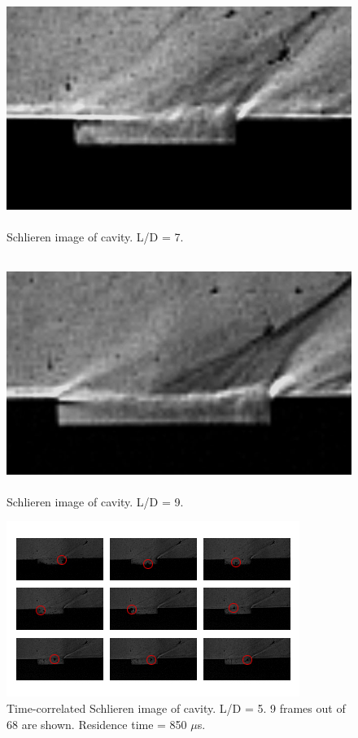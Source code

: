 \begin{figure}
\centering
\includegraphics[height = 3in]{Figures/7.jpg}
\caption[Schlieren image of cavity. L/D = 7.]{Schlieren image of cavity. L/D = 7.}
\label{fig:7}
\end{figure}

\begin{figure}
\centering
\includegraphics[height = 3in]{Figures/9.jpg}
\caption[Schlieren image of cavity. L/D = 9.]{Schlieren image of cavity. L/D = 9.}
\label{fig:9}
\end{figure}

\begin{figure}[p!]
\centering
\includegraphics[width = \textwidth]{Figures/cavResTime.jpg}
\caption[Time-correlated Schlieren image of cavity. L/D = 5.]{Time-correlated Schlieren image of cavity. L/D = 5. 9 frames out of 68 are shown. Residence time = 850 $\mu$s.}
\label{fig:9}
\end{figure}
\clearpage

